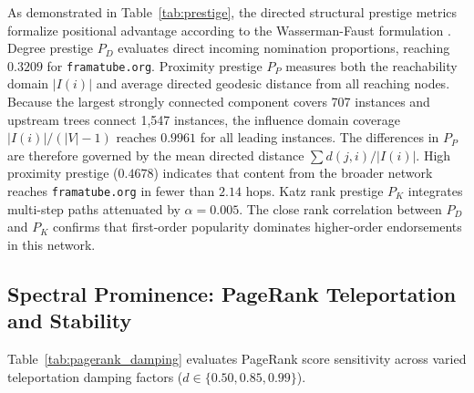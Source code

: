 \documentclass[conference]{IEEEtran}
\begin{document}
As demonstrated in Table~\ref{tab:prestige}, the directed structural prestige metrics formalize positional advantage according to the Wasserman-Faust formulation \cite{wasserman1994social}. Degree prestige $P_D$ evaluates direct incoming nomination proportions, reaching $0.3209$ for \texttt{framatube.org}. Proximity prestige $P_P$ measures both the reachability domain $|I(i)|$ and average directed geodesic distance from all reaching nodes. Because the largest strongly connected component covers 707 instances and upstream trees connect 1,547 instances, the influence domain coverage $|I(i)| / (|V|-1)$ reaches $0.9961$ for all leading instances. The differences in $P_P$ are therefore governed by the mean directed distance $\sum d(j, i) / |I(i)|$. High proximity prestige ($0.4678$) indicates that content from the broader network reaches \texttt{framatube.org} in fewer than $2.14$ hops. Katz rank prestige $P_K$ integrates multi-step paths attenuated by $\alpha = 0.005$. The close rank correlation between $P_D$ and $P_K$ confirms that first-order popularity dominates higher-order endorsements in this network.

\subsection{Spectral Prominence: PageRank Teleportation and Stability}

Table~\ref{tab:pagerank_damping} evaluates PageRank score sensitivity across varied teleportation damping factors ($d \in \{0.50, 0.85, 0.99\}$).

\begin{table}[htbp]
\caption{PageRank Top-5 Ranking Stability Under Damping Factor Perturbations}
\label{tab:pagerank_damping}
\centering
{}
\end{table}
\end{document}
